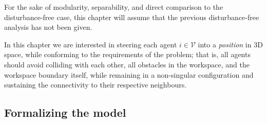 \begin{remark}
For the sake of modularity, separability, and direct comparison to the
disturbance-free case, this chapter will assume
that the previous disturbance-free analysis has not been given.
\end{remark}

In this chapter we are interested in steering each agent $i \in \mathcal{V}$
into a \textit{position} in 3D space, while conforming to the requirements
of the problem; that is, all agents should avoid colliding with each other, all
obstacles in the workspace, and the workspace boundary itself, while remaining
in a non-singular configuration and sustaining the connectivity to their
respective neighbours.

\subsection{Formalizing the model}

